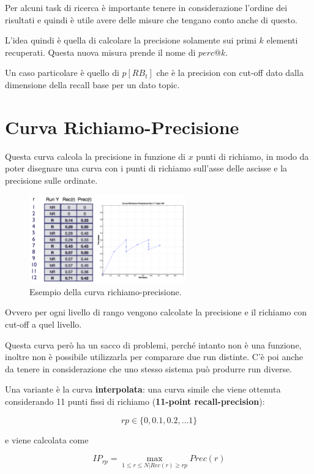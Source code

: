 Per alcuni task di ricerca è importante tenere in considerazione l'ordine dei risultati e quindi è utile avere delle misure che tengano conto anche di questo.

L'idea quindi è quella di calcolare la precisione solamente sui primi $k$ elementi recuperati. Questa nuova misura prende il nome di $perc@k$.

Un caso particolare è quello di $p[RB_t]$ che è la precision con cut-off dato dalla dimensione della recall base per un dato topic.

\section{Curva Richiamo-Precisione}

Questa curva calcola la precisione in funzione di $x$ punti di richiamo, in modo da poter disegnare una curva con i punti di richiamo sull'asse delle ascisse e la precisione sulle ordinate.

\begin{figure}[htbp]
	\centering
	\includegraphics[width=0.6\textwidth]{images/l15-fig-4.png}
	\caption{Esempio della curva richiamo-precisione.}
\end{figure}

Ovvero per ogni livello di rango vengono calcolate la precisione e il richiamo con cut-off a quel livello.

Questa curva però ha un sacco di problemi, perché intanto non è una funzione, inoltre non è possibile utilizzarla per comparare due run distinte. C'è poi anche da tenere in considerazione che uno stesso sistema può produrre run diverse.

Una variante è la curva \textbf{interpolata}: una curva simile che viene ottenuta considerando 11 punti fissi di richiamo (\textbf{11-point recall-precision}):

$$
rp \in \{ 0, 0.1, 0.2, \ldots 1 \}
$$

e viene calcolata come 

$$
IP_{rp} = \max_{1 \leq r \leq N | Rec(r) \geq rp} Prec(r)
$$

